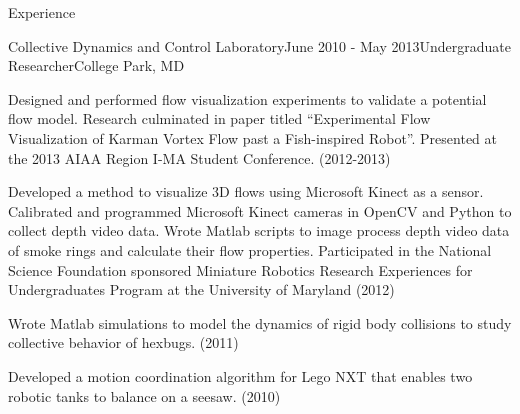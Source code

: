 \documentclass{resume} %
\begin{document}
\begin{rSection}{Experience}
\begin{rSubsection}{Collective Dynamics and Control Laboratory}{June 2010 - May 2013}{Undergraduate Researcher}{College Park, MD}
\item Designed and performed flow visualization experiments to validate a potential flow model. Research culminated in paper
	titled ``Experimental Flow Visualization of Karman Vortex Flow past a Fish-inspired Robot''. Presented at the 2013 AIAA
	Region I-MA Student Conference. (2012-2013)
\item   Developed a method to visualize 3D flows using Microsoft Kinect as a sensor. Calibrated and programmed Microsoft Kinect cameras in OpenCV and Python to collect depth video data. Wrote Matlab scripts to image process depth video data of smoke rings and calculate their flow properties. Participated in the National Science Foundation sponsored Miniature Robotics Research Experiences for Undergraduates Program at the University of Maryland (2012)
\item Wrote Matlab simulations to model the dynamics of rigid body collisions to study collective behavior of hexbugs. (2011)
\item Developed a motion coordination algorithm for Lego NXT that enables two robotic tanks to balance on a seesaw. (2010)
\end{rSubsection}


\end{rSection}


\end{document}
